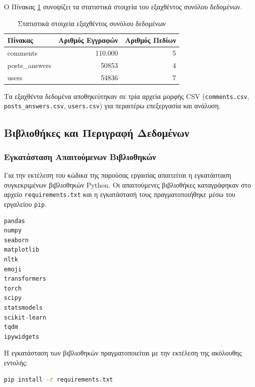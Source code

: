 \documentclass[a4paper,11pt,oneside,openany]{ioniothesis}
\begin{document}
Ο Πίνακας \ref{tab:dataset_stats} συνοψίζει τα στατιστικά στοιχεία του εξαχθέντος συνόλου δεδομένων.

\begin{table}[H]
\centering
\caption{Στατιστικά στοιχεία εξαχθέντος συνόλου δεδομένων}
\label{tab:dataset_stats}
\begin{tabular}{@{}lrr@{}}
\toprule
\textbf{Πίνακας} & \textbf{Αριθμός Εγγραφών} & \textbf{Αριθμός Πεδίων} \\
\midrule
comments & 110.000 & 5 \\
posts\_answers & 50853 & 4 \\
users & 54836 & 7 \\
\bottomrule
\end{tabular}
\end{table}

Τα εξαχθέντα δεδομένα αποθηκεύτηκαν σε τρία αρχεία μορφής CSV (\texttt{comments.csv}, \texttt{posts\_answers.csv}, \texttt{users.csv}) για περαιτέρω επεξεργασία και ανάλυση.


\subsection{Βιβλιοθήκες και Περιγραφή Δεδομένων }
\label{sec:Περιγραφή Δεδομένων}

\subsubsection{Εγκατάσταση Απαιτούμενων Βιβλιοθηκών}

Για την εκτέλεση του κώδικα της παρούσας εργασίας απαιτείται η εγκατάσταση συγκεκριμένων βιβλιοθηκών Python. Οι απαιτούμενες βιβλιοθήκες καταγράφηκαν στο αρχείο \texttt{requirements.txt} και η εγκατάστασή τους πραγματοποιήθηκε μέσω του εργαλείου \texttt{pip}.

\begin{lstlisting}[language=Python, caption={Περιεχόμενα αρχείου requirements.txt}, label={lst:requirements}]
pandas
numpy
seaborn
matplotlib
nltk
emoji
transformers
torch
scipy
statsmodels
scikit-learn
tqdm
ipywidgets
\end{lstlisting}

Η εγκατάσταση των βιβλιοθηκών πραγματοποιείται με την εκτέλεση της ακόλουθης εντολής:

\begin{lstlisting}[language=bash, caption={Εντολή εγκατάστασης βιβλιοθηκών}, label={lst:pip_install}]
pip install -r requirements.txt
\end{lstlisting}
\end{document}
